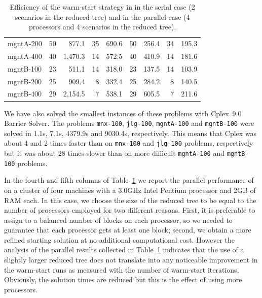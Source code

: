 \begin{table}[ht]
\begin{center}
\begin{tabular}{|l||rr|rr||rr|rr|}
mgntA-200     &   50 &  877.1 &   35 &  690.6 &  50 &  256.4 &  34 &  195.3 \\
mgntA-400     &   40 &1,470.3 &   14 &  572.5 &  40 &  410.9 &  14 &  181.6 \\
\hline
mgntB-100     &   23 &  511.1 &   14 &  318.0 &  23 &  137.5 &  14 &  103.9 \\
mgntB-200     &   25 &  909.4 &    8 &  332.4 &  25 &  284.2 &   8 &  140.5 \\
mgntB-400     &   29 &2,154.5 &    7 &  538.1 &  29 &  605.5 &   7 &  211.6 \\
\hline
    \end{tabular}
    \caption{Efficiency of the warm-start strategy in \OOPS in the serial
             case (2 scenarios in the reduced tree) and in the parallel case
	     (4 processors and 4 scenarios in the reduced tree).}
    \label{table:oops}
  \end{center} \vspace{-3ex}
\end{table}


We have also solved the smallest instances of these problems 
with Cplex~9.0 Barrier Solver. The problems 
{\tt mnx-100}, {\tt jlg-100}, {\tt mgntA-100} and {\tt mgntB-100} 
were solved in 1.1s, 7.1s, 4379.9s and 9030.4s, respectively.
This means that Cplex was about 4 and 2 times faster than \OOPS
on {\tt mnx-100} and {\tt jlg-100} problems, respectively 
but it was about 28 times slower than \OOPS on more difficult
{\tt mgntA-100} and {\tt mgntB-100} problems.

In the fourth and fifth columns of Table~\ref{table:oops} 
we report the parallel performance 
of \OOPS on a cluster of four machines with a 3.0GHz Intel Pentium 
processor and 2GB of RAM each.
In this case, we choose the size of the reduced tree to be equal 
to the number of processors employed for two different reasons.
First, it is preferable to assign to \OOPS a balanced number of blocks 
on each processor, so we needed to guarantee that each processor 
gets at least one block; second, we obtain a more refined 
starting solution at no additional computational cost. 
However the analysis of the parallel results collected 
in Table~\ref{table:oops}
indicates that the use of a slightly larger reduced tree does not 
translate into any noticeable improvement in the warm-start runs 
as measured with the number of warm-start iterations.
Obviously, the solution times are reduced but this is the effect 
of using more processors.

